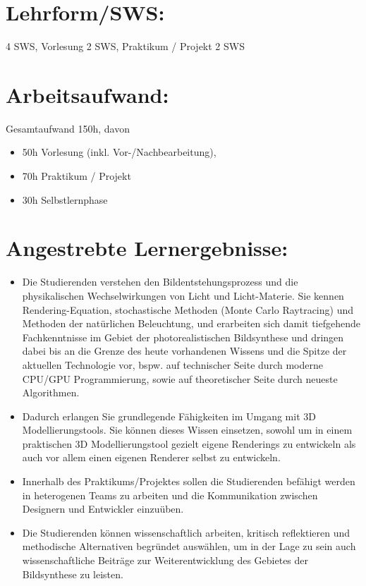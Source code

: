 \section*{Lehrform/SWS:}\label{lehrformsws-16}

4 SWS, Vorlesung 2 SWS, Praktikum / Projekt 2 SWS

\section*{Arbeitsaufwand:}\label{arbeitsaufwand-22}

Gesamtaufwand 150h, davon

\begin{itemize}
\tightlist
\item
  50h Vorlesung (inkl. Vor-/Nachbearbeitung),
\item
  70h Praktikum / Projekt
\item
  30h Selbstlernphase
\end{itemize}

\section*{Angestrebte
Lernergebnisse:}\label{angestrebte-lernergebnisse-16}

\begin{itemize}
\tightlist
\item
  Die Studierenden verstehen den Bildentstehungsprozess und die
  physikalischen Wechselwirkungen von Licht und Licht-Materie. Sie
  kennen Rendering-Equation, stochastische Methoden (Monte Carlo
  Raytracing) und Methoden der natürlichen Beleuchtung, und erarbeiten
  sich damit tiefgehende Fachkenntnisse im Gebiet der photorealistischen
  Bildsynthese und dringen dabei bis an die Grenze des heute vorhandenen
  Wissens und die Spitze der aktuellen Technologie vor, bspw. auf
  technischer Seite durch moderne CPU/GPU Programmierung, sowie auf
  theoretischer Seite durch neueste Algorithmen.
\item
  Dadurch erlangen Sie grundlegende Fähigkeiten im Umgang mit 3D
  Modellierungstools. Sie können dieses Wissen einsetzen, sowohl um in
  einem praktischen 3D Modellierungstool gezielt eigene Renderings zu
  entwickeln als auch vor allem einen eigenen Renderer selbst zu
  entwickeln.
\item
  Innerhalb des Praktikums/Projektes sollen die Studierenden befähigt
  werden in heterogenen Teams zu arbeiten und die Kommunikation zwischen
  Designern und Entwickler einzuüben.
\item
  Die Studierenden können wissenschaftlich arbeiten, kritisch
  reflektieren und methodische Alternativen begründet auswählen, um in
  der Lage zu sein auch wissenschaftliche Beiträge zur Weiterentwicklung
  des Gebietes der Bildsynthese zu leisten.
\end{itemize}

